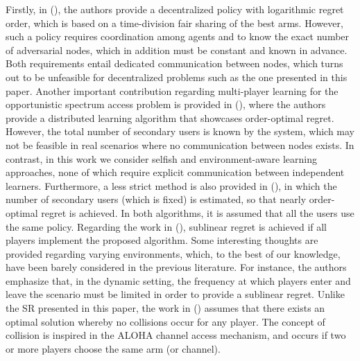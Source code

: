 \documentclass[preprint,12pt]{elsarticle}
\begin{document}
Firstly, in (\citealp{liu2010distributed}), the authors provide a decentralized policy with logarithmic regret order, which is based on a time-division fair sharing of the best arms. However, such a policy requires coordination among agents and to know the exact number of adversarial nodes, which in addition must be constant and known in advance. Both requirements entail dedicated communication between nodes, which turns out to be unfeasible for decentralized problems such as the one presented in this paper. Another important contribution regarding multi-player learning for the opportunistic spectrum access problem is provided in (\citealp{anandkumar2011distributed}), where the authors provide a distributed learning algorithm that showcases order-optimal regret. However, the total number of secondary users is known by the system, which may not be feasible in real scenarios where no communication between nodes exists. In contrast, in this work we consider selfish and environment-aware learning approaches, none of which require explicit communication between independent learners. Furthermore, a less strict method is also provided in (\citealp{anandkumar2011distributed}), in which the number of secondary users (which is fixed) is estimated, so that nearly order-optimal regret is achieved. In both algorithms, it is assumed that all the users use the same policy. Regarding the work in (\citealp{rosenski2016multi}), sublinear regret is achieved if all players implement the proposed algorithm. Some interesting thoughts are provided regarding varying environments, which, to the best of our knowledge, have been barely considered in the previous literature. For instance, the authors emphasize that, in the dynamic setting, the frequency at which players enter and leave the scenario must be limited in order to provide a sublinear regret. Unlike the SR presented in this paper, the work in (\citealp{rosenski2016multi}) assumes that there exists an optimal solution whereby no collisions occur for any player. The concept of collision is inspired in the ALOHA channel access mechanism, and occurs if two or more players choose the same arm (or channel). 
 
\end{document}

